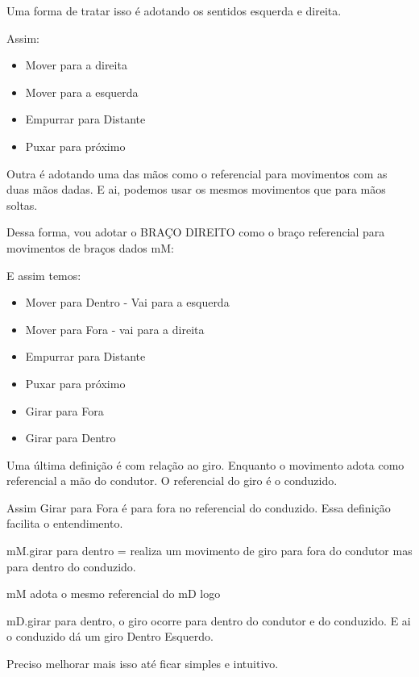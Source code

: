 Uma forma de tratar isso é adotando os sentidos esquerda e direita. 

Assim: 

\begin{itemize}
	\item Mover para a direita
	\item Mover para a esquerda
	\item Empurrar para Distante
	\item Puxar para próximo
\end{itemize}


Outra é adotando uma das mãos como o referencial para movimentos com as duas mãos dadas. 
E ai, podemos usar os mesmos movimentos que para mãos soltas.

Dessa forma, vou adotar o BRAÇO DIREITO como o braço referencial para movimentos de braços dados mM:

E assim temos:

\begin{itemize}
	\item Mover para Dentro - Vai para a esquerda
	\item Mover para Fora - vai para a direita 
	\item Empurrar para Distante
	\item Puxar para próximo
	\item Girar para Fora 
	\item Girar para Dentro
\end{itemize}


Uma última definição é com relação ao giro. Enquanto o movimento adota como referencial a mão do condutor.
O referencial do giro é o conduzido.

Assim Girar para Fora é para fora no referencial do conduzido. Essa definição facilita o entendimento.

mM.girar para dentro = realiza um movimento de  giro para fora do condutor mas para dentro do conduzido.

mM adota o mesmo referencial do mD logo 

mD.girar para dentro, o giro ocorre para dentro do condutor e do conduzido. E ai o conduzido dá um giro Dentro Esquerdo.

Preciso melhorar mais isso até ficar simples e intuitivo.







